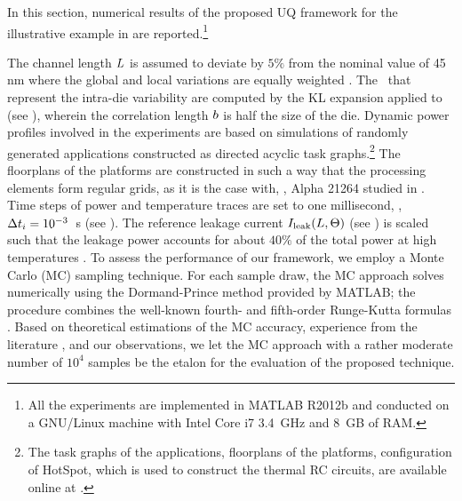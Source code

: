 In this section, numerical results of the proposed UQ framework for the illustrative example in  are reported.\footnote{All the experiments are implemented in MATLAB R2012b \cite{matlab} and conducted on a GNU/Linux machine with Intel Core i7 3.4~GHz and 8~GB of RAM.}

The channel length $L$ is assumed to deviate by $5\%$ from the nominal value of 45 nm where the global and local variations are equally weighted \cite{juan2011, juan2012}. The \rvs\ that represent the intra-die variability are computed by the KL expansion applied to  (see ), wherein the correlation length $b$ is half the size of the die. Dynamic power profiles involved in the experiments are based on simulations of randomly generated applications constructed as directed acyclic task graphs.\footnote{The task graphs of the applications, floorplans of the platforms, configuration of HotSpot, which is used to construct the thermal RC circuits, are available online at \cite{sources}.} The floorplans of the platforms are constructed in such a way that the processing elements form regular grids, as it is the case with, \eg, Alpha 21264 studied in \cite{juan2011}. Time steps of power and temperature traces are set to one millisecond, \ie, $\Delta t_i = 10^{-3}$~s (see ). The reference leakage current $I_{\text{leak}}(L, \Theta)$ (see ) is scaled such that the leakage power accounts for about $40\%$ of the total power at high temperatures \cite{liu2007}. To assess the performance of our framework, we employ a Monte Carlo (MC) sampling technique. For each sample draw, the MC approach solves  numerically using the Dormand-Prince method provided by MATLAB; the procedure combines the well-known fourth- and fifth-order Runge-Kutta formulas \cite{press2007}. Based on theoretical estimations \cite{diaz-emparanza2002} of the MC accuracy, experience from the literature \cite{xiu2010, eldred2009, maitre2010, shen2009}, and our observations, we let the MC approach with a rather moderate number of $10^4$ samples be the etalon for the evaluation of the proposed technique.

